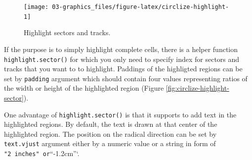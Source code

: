 \documentclass[]{book}
\newenvironment{Shaded}{\begin{snugshade}}{\end{snugshade}}
\newcommand{\KeywordTok}[1]{\textcolor[rgb]{0.13,0.29,0.53}{\textbf{#1}}}
\newcommand{\DataTypeTok}[1]{\textcolor[rgb]{0.13,0.29,0.53}{#1}}
\newcommand{\DecValTok}[1]{\textcolor[rgb]{0.00,0.00,0.81}{#1}}
\newcommand{\FloatTok}[1]{\textcolor[rgb]{0.00,0.00,0.81}{#1}}
\newcommand{\StringTok}[1]{\textcolor[rgb]{0.31,0.60,0.02}{#1}}
\newcommand{\OtherTok}[1]{\textcolor[rgb]{0.56,0.35,0.01}{#1}}
\newcommand{\NormalTok}[1]{#1}
\begin{document}
\begin{Shaded}
\end{Shaded}

\begin{figure}

{\centering \texttt{[image: 03-graphics\_files/figure-latex/circlize-highlight-1]} 

}

\caption{Highlight sectors and tracks.}\label{fig:circlize-highlight}
\end{figure}

If the purpose is to simply highlight complete cells, there is a helper
function \texttt{highlight.sector()} for which you only need to specify
index for sectors and tracks that you want to to highlight. Paddings of
the highligted regions can be set by \texttt{padding} argument which
should contain four values representing ratios of the width or height of
the highlighted region (Figure \ref{fig:circlize-highlight-sector}).

One advantage of \texttt{highlight.sector()} is that it supports to add
text in the highlighted regions. By default, the text is drawn at that
center of the highlighted region. The position on the radical direction
can be set by \texttt{text.vjust} argument either by a numeric value or
a string in form of
\texttt{"2\ inches"\textasciigrave{}\textasciigrave{}\ or}``-1.2cm''`.
\end{document}
